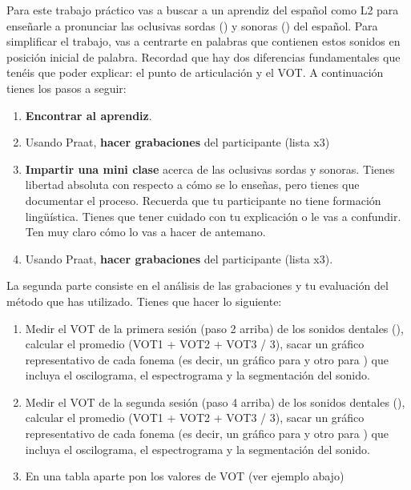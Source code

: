\documentclass[12pt]{article}
\begin{document}
\noindent Para este trabajo práctico vas a buscar a un aprendiz del español como 
L2 para enseñarle a pronunciar las oclusivas sordas () y 
sonoras () del español. Para simplificar el trabajo, vas a 
centrarte en palabras que contienen estos sonidos en posición inicial de palabra. 
Recordad que hay dos diferencias fundamentales que tenéis que poder explicar: el 
punto de articulación y el VOT. A continuación tienes los pasos a seguir:

\begin{enumerate}
	\item \textbf{Encontrar al aprendiz}.
	\item Usando Praat, \textbf{hacer grabaciones} del participante (lista x3)
	\item \textbf{Impartir una mini clase} acerca de las oclusivas sordas y sonoras. 
	Tienes libertad absoluta con respecto a cómo se lo enseñas, pero tienes que 
	documentar el proceso. Recuerda que tu participante no tiene formación lingüística. 
	Tienes que tener cuidado con tu explicación o le vas a confundir. Ten muy claro cómo 
	lo vas a hacer de antemano. 
	\item Usando Praat, \textbf{hacer grabaciones} del participante (lista x3).
\end{enumerate}

\noindent La segunda parte consiste en el análisis de las grabaciones y tu evaluación 
del método que has utilizado. Tienes que hacer lo siguiente:

\begin{enumerate}
	\item Medir el VOT de la primera sesión (paso 2 arriba) de los sonidos dentales (), 
	calcular el promedio (VOT1 + VOT2 + VOT3 / 3), sacar un gráfico representativo de cada fonema 
	(es decir, un gráfico para  y otro para ) que incluya el oscilograma, 
	el espectrograma y la segmentación del sonido.
	\item Medir el VOT de la segunda sesión (paso 4 arriba) de los sonidos dentales (), 
	calcular el promedio (VOT1 + VOT2 + VOT3 / 3), sacar un gráfico representativo de cada fonema 
	(es decir, un gráfico para  y otro para ) que incluya el oscilograma, 
	el espectrograma y la segmentación del sonido.
	\item En una tabla aparte pon los valores de VOT (ver ejemplo abajo)
\end{enumerate}
\end{document}

